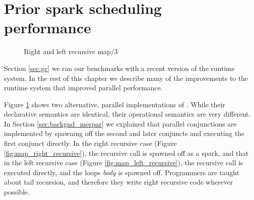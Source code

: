\section{Prior spark scheduling performance}
\label{sec:old_scheduling_performance}


\begin{figure}
\begin{center}
%
\end{center}
\caption{Right and left recursive map/3}
\label{fig:map_right_and_left_recursive}
\end{figure}

Section \ref{sec:gc} we ran our benchmarks with a recent version of the
runtime system.
In the rest of this chapter we describe many of the improvements to the
runtime system that improved parallel performance.

Figure \ref{fig:map_right_and_left_recursive} shows two alternative, parallel
implementations of .
While their declarative semantics are identical,
their operational semantics are very different.
In Section \ref{sec:backgnd_merpar} we explained that parallel conjunctions
are implemented by spawning off the second and later conjuncts and executing
the first conjunct directly.
In the right recursive case (Figure \ref{fig:map_right_recursive}),
the recursive call is spawned off as a spark,
and that in the left recursive case (Figure \ref{fig:map_left_recursive}),
the recursive call is executed directly, and the loops \emph{body} is
spawned off.
Programmers are taught about tail recursion,
and therefore they write right recursive code wherever possible.

